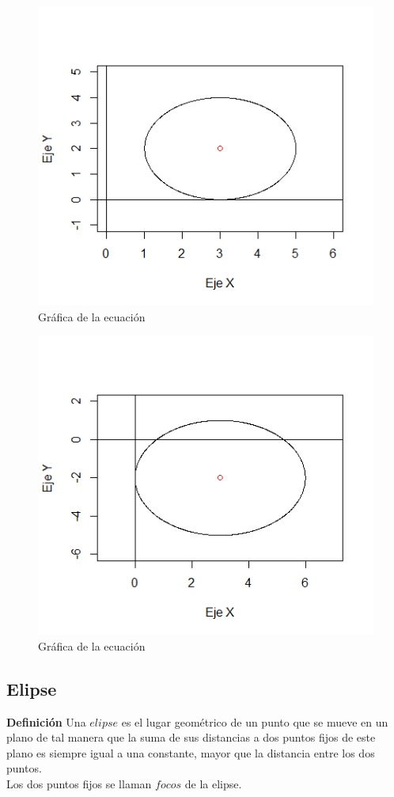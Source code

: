 \documentclass[12pt,a4paper]{article} %
\begin{document}
\begin{figure}[h]
\centering
\includegraphics[scale=0.8]{Circunferencia1}
\caption{Gráfica de la ecuación }
\label{fig:Circunferencia}
\end{figure}

\begin{figure}[ht]
\centering
\includegraphics[scale=0.8]{Circunferencia2}
\caption{Gráfica de la ecuación }
\label{fig:Circunferencia2}
\end{figure}


\newpage

\subsection{Elipse}
\textbf{Definición} Una $elipse$ es el lugar geométrico de un punto que se mueve en un plano de tal manera que la suma de sus distancias a dos puntos fijos de este plano es siempre igual a una constante, mayor que la distancia entre los dos puntos.
\\Los dos puntos fijos se llaman $focos$ de la elipse. 
\end{document}
